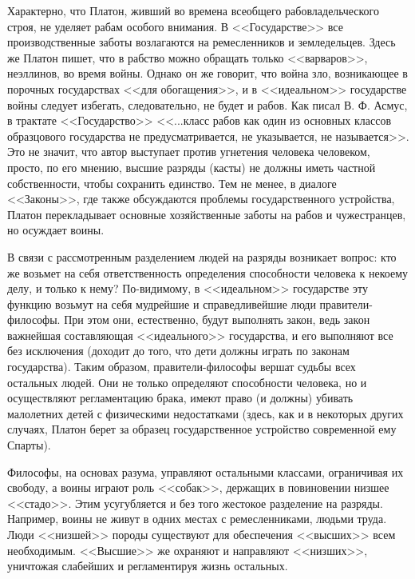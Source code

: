 	Характерно, что Платон, живший во времена всеобщего рабовладельческого 
	строя, не уделяет рабам особого внимания. В <<Государстве>> все 
	производственные заботы возлагаются на ремесленников и земледельцев. Здесь 
	же Платон пишет, что в рабство можно обращать только <<варваров>>, 
	неэллинов, во время войны. Однако он же говорит, что война зло, 
	возникающее в порочных государствах <<для обогащения>>, и в <<идеальном>> 
	государстве войны следует избегать, следовательно, не будет и рабов. 
	Как писал В. Ф. Асмус, в трактате <<Государство>> <<...класс рабов как один 
	из основных классов образцового государства не предусматривается, не 
	указывается, не называется>>. Это не значит, что автор выступает против 
	угнетения человека человеком, просто, по его мнению, высшие разряды 
	(касты) не должны иметь частной собственности, чтобы сохранить единство. 
	Тем не менее, в диалоге <<Законы>>, где также обсуждаются проблемы 
	государственного устройства, Платон перекладывает основные хозяйственные 
	заботы на рабов и чужестранцев, но осуждает воины. 

	В связи с рассмотренным разделением людей на разряды возникает вопрос: 
	кто же возьмет на себя ответственность определения способности человека к 
	некоему делу, и только к нему? По-видимому, в <<идеальном>> государстве эту 
	функцию возьмут на себя мудрейшие и справедливейшие люди 
	правители-философы. При этом они, естественно, будут выполнять закон, 
	ведь закон важнейшая составляющая <<идеального>> государства, и его выполняют 
	все без исключения (доходит до того, что дети должны играть по законам 
	государства). Таким образом, правители-философы вершат судьбы всех 
	остальных людей. Они не только определяют способности человека, но и 
	осуществляют регламентацию брака, имеют право (и должны) убивать 
	малолетних детей с физическими недостатками (здесь, как и в некоторых 
	других случаях, Платон берет за образец государственное устройство 
	современной ему Спарты). 

	Философы, на основах разума, управляют остальными классами, ограничивая их 
	свободу, а воины играют роль <<собак>>, держащих в повиновении низшее <<стадо>>. 
	Этим усугубляется и без того жестокое разделение на разряды. Например, воины 
	не живут в одних местах с ремесленниками, людьми труда. Люди <<низшей>> породы 
	существуют для обеспечения <<высших>> всем необходимым. <<Высшие>> же охраняют и 
	направляют <<низших>>, уничтожая слабейших и регламентируя жизнь остальных. 

